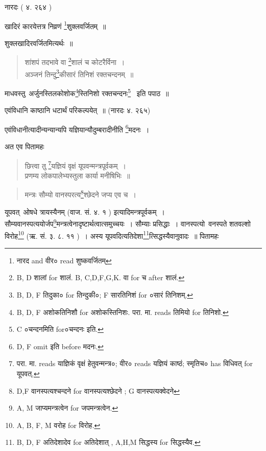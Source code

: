\documentclass[11pt, openany]{book}
\begin{document}
\noindent
नारदः ( ४. २६४ ) 

खादिरं कारयेत्तत्र निव्रणं \renewcommand{\thefootnote}{2}\footnote{नारद and वीर० read शुष्कवर्जितम्}शुक्लवर्जितम्~॥

शुक्लखादिरवर्जितमित्यर्थः~॥

\begin{quote}
{\vy शांशपं तदभावे वा \renewcommand{\thefootnote}{3}\footnote{B, D शालां for शालं. B, C,D,F,G,K. वा for च after शालं.}शालं च कोटरैर्विना~।\\
अञ्जनं तिन्दु\renewcommand{\thefootnote}{4}\footnote{B, D, F तिदुका० for तिन्दुकी०; F सारतिनिशं for ०सारं तिनिशम्.}कीसारं तिनिशं रक्तचन्दनम्~॥}
\end{quote}

\noindent
माधवस्तु\textendash\ अर्जुनस्तिलकोशोक\renewcommand{\thefootnote}{5}\footnote{B, D, F अशोकतिनिशौ for अशोकस्तिनिशः. परा. मा. reads तिमियो for तिनिशो.}स्तिनिशो रक्तचन्दनः\renewcommand{\thefootnote}{6}\footnote{C ०चन्दनमिति for०चन्दनः इति.} \textendash\ इति पपाठ~॥

एवंविधानि काष्ठानि धटार्थं परिकल्पयेत्~॥ (नारदः ४. २६५) 

एवंविधानीत्यादीन्यन्यान्यपि यज्ञियान्यौदुम्बरादीनीति \renewcommand{\thefootnote}{7}\footnote{D, F omit इति before मदनः.}मदनः~।

\noindent
अत एव पितामहः

\begin{quote}
{\vy छित्त्वा तु \renewcommand{\thefootnote}{8}\footnote{परा. मा. reads याज्ञिकं वृक्षं हेतुवन्मन्त्र०; वीर० reads यज्ञियं काष्ठं; स्मृतिच० has विधिवत् for यूपवत्.}यज्ञियं वृक्षं यूपवन्मन्त्रपूर्वकम्~।\\
प्रणम्य लोकपालेभ्यस्तुला कार्या मनीषिभिः~॥}
\end{quote}

\newpage 

\begin{quote}
{\vy मन्त्रः सौम्यो वानस्परत्य\renewcommand{\thefootnote}{1}\footnote{D,F वानस्पत्यश्चन्दने for वानस्पत्यश्छेदने ; G वानस्पत्यक्वेदने\textendash }श्छेदने जप्य एव च~।}
\end{quote}

यूपवत्\textendash\ ओषधे त्रायस्यैनम् (वाज. सं. ४. १ ) इत्यादिमन्त्रपूर्वकम्~। सौम्यवानस्पत्ययोर्जप\renewcommand{\thefootnote}{2}\footnote{A, M जाप्यमन्त्रत्वेन for जपमन्त्रत्वेन.}मन्त्रत्वेनादृष्टार्थत्वात्समुच्चयः~। सौम्याः प्रसिद्धाः~। वानस्पत्यो\textendash\ वनस्पते शतवल्शो विरोह\renewcommand{\thefootnote}{3}\footnote{A, B, F, M वरोह for विरोह.} (ऋ. सं. ३. ८. ११ )~। अस्य यूपवदित्यतिदेशा\renewcommand{\thefootnote}{4}\footnote{B, D, F अतिदेशादेव for अतिदेशात् , A,H,M सिद्धस्य for सिद्धस्यैव.}त्सिद्धस्यैवानुवादः~॥ पितामहः
\end{document}
